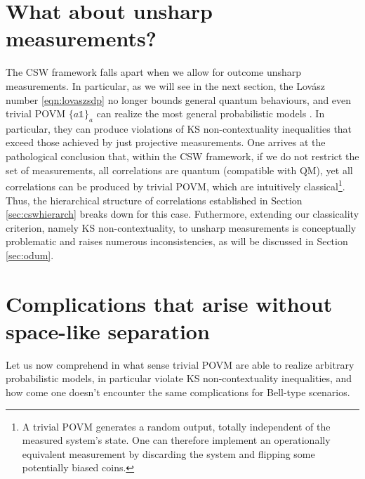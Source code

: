 \section{What about unsharp measurements?}
\label{sec:cswunsharp}
The CSW framework falls apart when we allow for outcome unsharp measurements. In particular, as we will see in the next section, the Lovász number \ref{eqn:lovaszsdp} no longer bounds general quantum behaviours, and even trivial POVM $\{a\mathbb{1}\}_{a}$ can realize the most general probabilistic models \cite{Kunjwal2019}. In particular, they can produce violations of KS non-contextuality inequalities that exceed those achieved by just projective measurements. One arrives at the pathological conclusion that, within the CSW framework, if we do not restrict the set of measurements, all correlations are quantum (compatible with QM), yet all correlations can be produced by trivial POVM, which are intuitively classical\footnote{A trivial POVM generates a random output, totally independent of the measured system's state. One can therefore implement an operationally equivalent measurement by discarding the system and flipping some potentially biased coins.}. Thus, the hierarchical structure of correlations established in Section \ref{sec:cswhierarch} breaks down for this case. Futhermore, extending our classicality criterion, namely KS non-contextuality, to unsharp measurements is conceptually problematic and raises numerous inconsistencies, as will be discussed in Section \ref{sec:odum}.

\section{Complications that arise without space-like separation}
\label{sec:complicationscont}
Let us now comprehend in what sense trivial POVM are able to realize arbitrary probabilistic models, in particular violate KS non-contextuality inequalities, and how come one doesn't encounter the same complications for Bell-type scenarios. 


